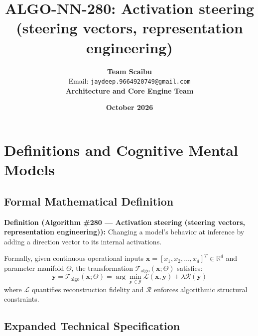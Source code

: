 \documentclass[11pt,a4paper]{article}
\title{\textbf{ALGO-NN-280: Activation steering (steering vectors, representation engineering)}}
\author{\textbf{Team Scaibu} \\ \small Email: \texttt{jaydeep.9664920749@gmail.com} \\ \small \textbf{Architecture and Core Engine Team}}
\date{\textbf{October 2026}}
\theoremstyle{definition}
\begin{document}
\maketitle

\section{Definitions and Cognitive Mental Models}

\subsection{Formal Mathematical Definition}
\textbf{Definition (Algorithm \#280 --- Activation steering (steering vectors, representation engineering)):}
Changing a model's behavior at inference by adding a direction vector to its internal activations.

Formally, given continuous operational inputs $\mathbf{x} = [x_1, x_2, \dots, x_d]^T \in \mathbb{R}^d$ and parameter manifold $\Theta$, the transformation $\mathcal{T}_{\text{algo}}(\mathbf{x}; \Theta)$ satisfies:
{\boldmath
\begin{equation}
\mathbf{y} = \mathcal{T}_{\text{algo}}(\mathbf{x}; \Theta) = \arg\min_{\mathbf{y} \in \mathcal{Y}} \mathcal{L}(\mathbf{x}, \mathbf{y}) + \lambda \mathcal{R}(\mathbf{y})
\end{equation}
}
where $\mathcal{L}$ quantifies reconstruction fidelity and $\mathcal{R}$ enforces algorithmic structural constraints.

\subsection{Expanded Technical Specification}
\end{document}
